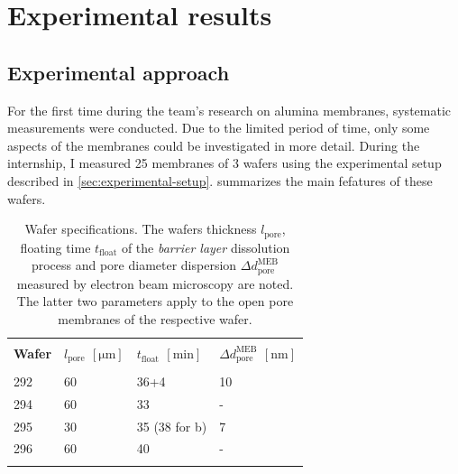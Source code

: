 \documentclass[../thesis.tex]{subfiles}
\begin{document}
  \chapter{Experimental results}
  \label{ch:experimental-results}


    \section{Experimental approach}
    \label{sec:conducted-measurements}

        For the first time during the team's research on alumina membranes, systematic measurements were conducted. Due to the limited period of time, only some aspects of the membranes could be investigated in more detail. During the internship, I measured 25 membranes of 3 wafers using the experimental setup described in \cref{sec:experimental-setup}.  summarizes the main fefatures of these wafers.

        

        \begin{table}[tb]
          \caption{Wafer specifications. The wafers thickness $l_\mathrm{pore}$, floating time $t_\mathrm{float}$ of the \textit{barrier layer} dissolution process and pore diameter dispersion $\Delta d_\mathrm{pore}^\mathrm{MEB}$ measured by electron beam microscopy are noted. The latter two parameters apply to the open pore membranes of the respective wafer.}
          \label{tbl:wafer-specifications}
          \begin{tabu} {X[r]X[r]X[r]X[r]}
            \unitoprule \\
            \textbf{Wafer} & \textbf{$l_\mathrm{pore}$ $[\si{\micro\meter}]$} & \textbf{$t_\mathrm{float}$ $[\si{\minute}]$} & \textbf{$\Delta d_\mathrm{pore}^\mathrm{MEB}$ $[\si{\nano\meter}]$} \\
            \unimidrule \\
            292 &60  &36+4   &10 \\
            294 &60  &33   &-  \\
            295 &30  &35 (38 for b)  &7  \\
            296 &60  &40  &-  \\
            \unitoprule \\
          \end{tabu}
        \end{table}
        \medskip
\end{document}
